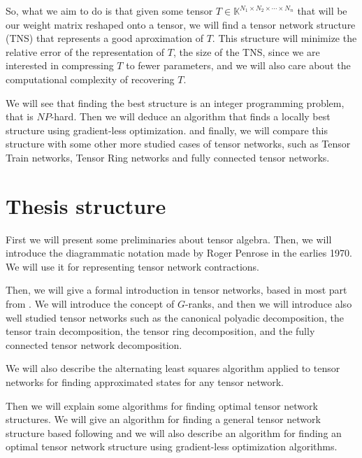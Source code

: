 \documentclass[11pt,a4paper,openright,oneside]{book}
\numberwithin{equation}{section}
\begin{document}
So, what we aim to do is that given some tensor $T \in \mathbb{K}^{N_1 \times N_2 \times \cdots \times N_n}$ that
will be our weight matrix reshaped onto a tensor, we will find a tensor network structure (TNS) that
represents a good aproximation of $T$. This structure will minimize the relative error of the representation of $T$,
the size of the TNS, since we are
interested in compressing $T$ to fewer parameters, and we will also care about the computational complexity of recovering
$T$.

We will see that finding the best structure is an integer programming problem, that is $NP$-hard. Then
we will deduce an algorithm that finds a locally best structure using gradient-less optimization.
and finally, we will compare this structure with some other more studied cases of tensor networks, such as Tensor Train networks, Tensor Ring networks and
fully connected tensor networks.


\section{Thesis structure}


First we will present some preliminaries about tensor algebra. 
Then, we will introduce the diagrammatic notation made by Roger Penrose in the earlies 1970. We will
use it for representing tensor network contractions.

Then, we will give a formal introduction in tensor networks, based in most part from \cite{yeTensorNetworkRanks2019}.
We will introduce the concept of $G$-ranks, and then we will introduce also well studied tensor networks such as the canonical polyadic decomposition, the tensor train decomposition, the tensor ring decomposition, and the fully connected
tensor network decomposition.

We will also describe the alternating least squares algorithm applied to tensor networks
for finding approximated states for any tensor network.

Then we will explain some algorithms for finding optimal tensor network structures. We will give an algorithm for
finding a general tensor network structure based following \cite{liPermutationSearchTensor2022} and we will also describe an algorithm for finding an 
optimal tensor network structure using gradient-less optimization algorithms.
\end{document}
